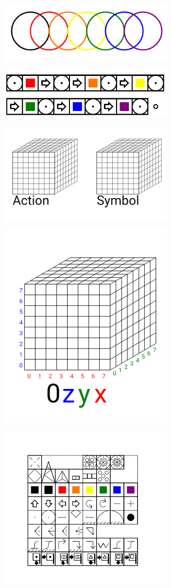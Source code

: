 \documentclass[11pt]{article}
\begin{document}
\includegraphics[width=3.5in]{image20.png}

\includegraphics[width=3.5in]{image21.png}

\includegraphics[width=3.5in]{image22.png}

\includegraphics[width=3.5in]{image23.png}

\includegraphics[width=3.5in]{image24.png}
\end{document}
